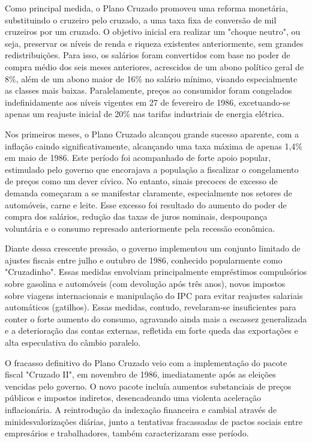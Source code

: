 \documentclass[a4paper,12pt]{article}[abntex2]
\begin{document}
Como principal medida, o Plano Cruzado promoveu uma reforma monetária, substituindo o cruzeiro pelo cruzado, a uma taxa fixa de conversão de mil cruzeiros por um cruzado. O objetivo inicial era realizar um "choque neutro", ou seja, preservar os níveis de renda e riqueza existentes anteriormente, sem grandes redistribuições. Para isso, os salários foram convertidos com base no poder de compra médio dos seis meses anteriores, acrescidos de um abono político geral de 8\%, além de um abono maior de 16\% no salário mínimo, visando especialmente as classes mais baixas. Paralelamente, preços ao consumidor foram congelados indefinidamente aos níveis vigentes em 27 de fevereiro de 1986, excetuando-se apenas um reajuste inicial de 20\% nas tarifas industriais de energia elétrica.

Nos primeiros meses, o Plano Cruzado alcançou grande sucesso aparente, com a inflação caindo significativamente, alcançando uma taxa máxima de apenas 1,4\% em maio de 1986. Este período foi acompanhado de forte apoio popular, estimulado pelo governo que encorajava a população a fiscalizar o congelamento de preços como um dever cívico. No entanto, sinais precoces de excesso de demanda começaram a se manifestar claramente, especialmente nos setores de automóveis, carne e leite. Esse excesso foi resultado do aumento do poder de compra dos salários, redução das taxas de juros nominais, despoupança voluntária e o consumo represado anteriormente pela recessão econômica.

Diante dessa crescente pressão, o governo implementou um conjunto limitado de ajustes fiscais entre julho e outubro de 1986, conhecido popularmente como "Cruzadinho". Essas medidas envolviam principalmente empréstimos compulsórios sobre gasolina e automóveis (com devolução após três anos), novos impostos sobre viagens internacionais e manipulação do IPC para evitar reajustes salariais automáticos (gatilhos). Essas medidas, contudo, revelaram-se insuficientes para conter o forte aumento do consumo, agravando ainda mais a escassez generalizada e a deterioração das contas externas, refletida em forte queda das exportações e alta especulativa do câmbio paralelo.

O fracasso definitivo do Plano Cruzado veio com a implementação do pacote fiscal "Cruzado II", em novembro de 1986, imediatamente após as eleições vencidas pelo governo. O novo pacote incluía aumentos substanciais de preços públicos e impostos indiretos, desencadeando uma violenta aceleração inflacionária. A reintrodução da indexação financeira e cambial através de minidesvalorizações diárias, junto a tentativas fracassadas de pactos sociais entre empresários e trabalhadores, também caracterizaram esse período.
\end{document}
